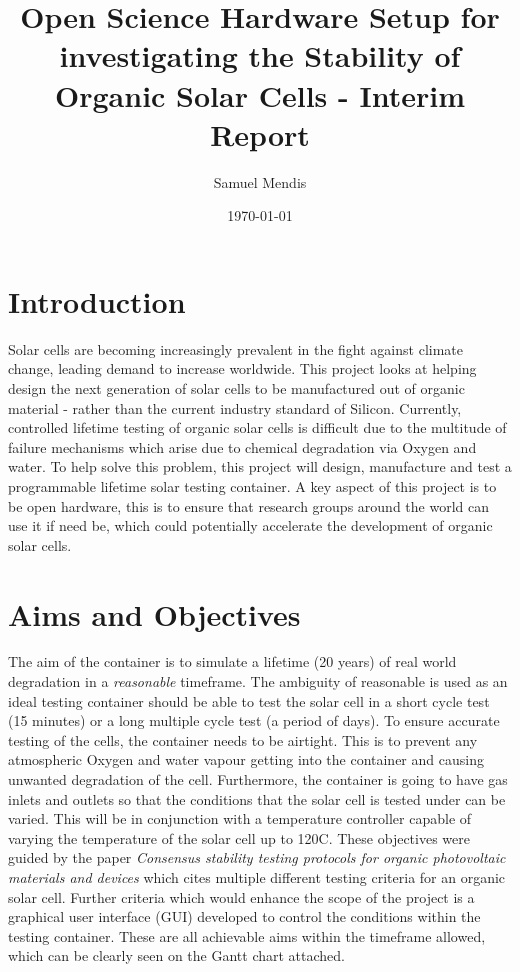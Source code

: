 \documentclass[a4paper,11pt]{article}
\begin{document}
\title{Open Science Hardware Setup for investigating the Stability of Organic Solar Cells - Interim Report}
\author{Samuel Mendis}
\date{\today}
\maketitle
\pagebreak
\section{Introduction}
Solar cells are becoming increasingly prevalent in the fight against climate change\cite[p.~XV]{RN45}, leading demand to increase worldwide. This project looks at helping design the next generation of solar cells to be manufactured out of organic material - rather than the current industry standard of Silicon. Currently, controlled lifetime testing of organic solar cells is difficult due to the multitude of failure mechanisms which arise due to chemical degradation via Oxygen and water\cite[p.~689]{RN38}. To help solve this problem, this project will design, manufacture and test a programmable lifetime solar testing container. A key aspect of this project is to be open hardware, this is to ensure that research groups around the world can use it if need be, which could potentially accelerate the development of organic solar cells. 

\section{Aims and Objectives}
The aim of the container is to simulate a lifetime (20 years) of real world degradation in a \emph{reasonable} timeframe. The ambiguity of reasonable is used as an ideal testing container should be able to test the solar cell in a short cycle test (15 minutes) or a long multiple cycle test (a period of days). To ensure accurate testing of the cells, the container needs to be airtight. This is to prevent any atmospheric Oxygen and water vapour getting into the container and causing unwanted degradation of the cell. Furthermore, the container is going to have gas inlets and outlets so that the conditions that the solar cell is tested under can be varied. This will be in conjunction with a temperature controller capable of varying the temperature of the solar cell up to 120\textdegree C. These objectives were guided by the paper \emph{Consensus stability testing protocols for organic photovoltaic materials and devices} \cite[p.~1255-1261]{RN47} which cites multiple different testing criteria for an organic solar cell. Further criteria which would enhance the scope of the project is a graphical user interface (GUI) developed to control the conditions within the testing container. These are all achievable aims within the timeframe allowed, which can be clearly seen on the Gantt chart attached. 
\end{document}
